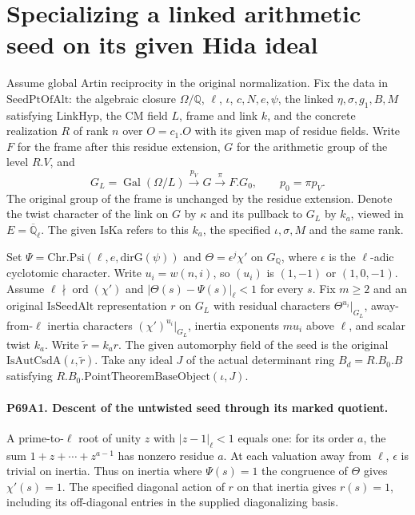 \section{Specializing a linked arithmetic seed on its given Hida ideal}

Assume global Artin reciprocity in the original normalization.
Fix the data in $\mathrm{SeedPtOfAlt}$: the algebraic closure
$\Omega/\mathbb Q$, $\ell$, $\iota$, $c,N,e,\psi$, the linked
$\eta,\sigma,g_1,B,M$ satisfying $\mathrm{LinkHyp}$, the CM field
$L$, frame and link $k$, and the concrete realization $R$ of
rank $n$ over $O=c_1.O$ with its given map of residue fields.
Write $F$ for the frame after this residue extension, $G$ for the
arithmetic group of the level $R.V$, and
\[
 G_L=\operatorname{Gal}(\Omega/L)
    \xrightarrow{\ p_V\ }G
    \xrightarrow{\ \pi\ }F.G_0,
 \qquad p_0=\pi p_V .
\]
The original group of the frame is unchanged by the residue
extension. Denote the twist character of the link on $G$ by
$\kappa$ and its pullback to $G_L$ by $k_a$, viewed in
$E=\overline{\mathbb Q}_\ell$. The given $\mathrm{IsKa}$ refers
to this $k_a$, the specified $\iota,\sigma,M$ and the same rank.

Set $\Psi=\mathrm{Chr.Psi}(\ell,e,\mathrm{dirG}(\psi))$ and
$\Theta=\epsilon^j\chi'$ on $G_{\mathbb Q}$, where
$\epsilon$ is the $\ell$-adic cyclotomic character. Write
$u_i=w(n,i)$, so $(u_i)$ is $(1,-1)$ or $(1,0,-1)$.
Assume $\ell\nmid\operatorname{ord}(\chi')$ and
$|\Theta(s)-\Psi(s)|_\ell<1$ for every $s$. Fix $m\ge2$
and an original $\mathrm{IsSeedAlt}$ representation $r$ on $G_L$
with residual characters $\Theta^{u_i}|_{G_L}$, away-from-$\ell$
inertia characters $(\chi')^{u_i}|_{G_L}$, inertia exponents
$m u_i$ above $\ell$, and scalar twist $k_a$. Write
$\widetilde r=k_a r$. The given automorphy field of the seed is the
original $\mathrm{IsAutCsdA}(\iota,\widetilde r)$.
Take any ideal $J$ of the actual determinant ring $B_d=R.B_0.B$
satisfying $R.B_0.\mathrm{PointTheoremBaseObject}(\iota,J)$.

\paragraph{P69A1. Descent of the untwisted seed through its marked quotient.}
A prime-to-$\ell$ root of unity $z$ with $|z-1|_\ell<1$ equals
one: for its order $a$, the sum $1+z+\cdots+z^{a-1}$ has nonzero
residue $a$. At each valuation away from $\ell$, $\epsilon$ is
trivial on inertia. Thus on inertia where $\Psi(s)=1$ the
congruence of $\Theta$ gives $\chi'(s)=1$. The specified diagonal
action of $r$ on that inertia gives $r(s)=1$, including its
off-diagonal entries in the supplied diagonalizing basis.

